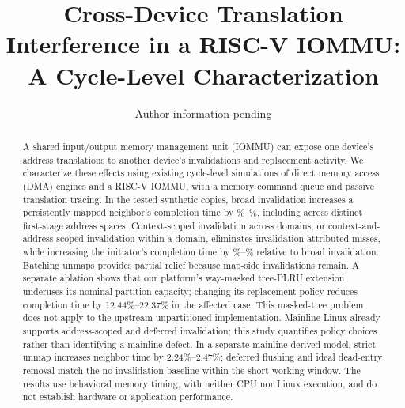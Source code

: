 \documentclass[sigconf,nonacm]{acmart}
\title{Cross-Device Translation Interference in a RISC-V IOMMU:\\A Cycle-Level Characterization}
\author{Author information pending}
\affiliation{\institution{\todo{需要作者决定: authors, affiliations, contact email}}\country{}}
\newcommand{\claim}[1]{} %
\begin{document}
\begin{abstract}
A shared input/output memory management unit (IOMMU) can expose one device's address translations to another device's invalidations and replacement activity.\claim{C001}
We characterize these effects using existing cycle-level simulations of direct memory access (DMA) engines and a RISC-V IOMMU, with a memory command queue and passive translation tracing.\claim{C002}
In the tested synthetic copies, broad invalidation increases a persistently mapped neighbor's completion time by \BSlowMin\%--\BSlowMax\%, including across distinct first-stage address spaces.\claim{C003}
Context-scoped invalidation across domains, or context-and-address-scoped invalidation within a domain, eliminates invalidation-attributed misses, while increasing the initiator's completion time by \APenaltyMin\%--\APenaltyMax\% relative to broad invalidation.\claim{C004}
Batching unmaps provides partial relief because map-side invalidations remain.\claim{C005}
A separate ablation shows that our platform's way-masked tree-PLRU extension underuses its nominal partition capacity; changing its replacement policy reduces completion time by 12.44\%--22.37\% in the affected case.\claim{C006}
This masked-tree problem does not apply to the upstream unpartitioned implementation.\claim{C007}
Mainline Linux already supports address-scoped and deferred invalidation; this study quantifies policy choices rather than identifying a mainline defect.\claim{C008}
In a separate mainline-derived model, strict unmap increases neighbor time by 2.24\%--2.47\%; deferred flushing and ideal dead-entry removal match the no-invalidation baseline within the short working window.\claim{N001}
The results use behavioral memory timing, with neither CPU nor Linux execution, and do not establish hardware or application performance.\claim{C009}
\end{abstract}
\maketitle
\end{document}

